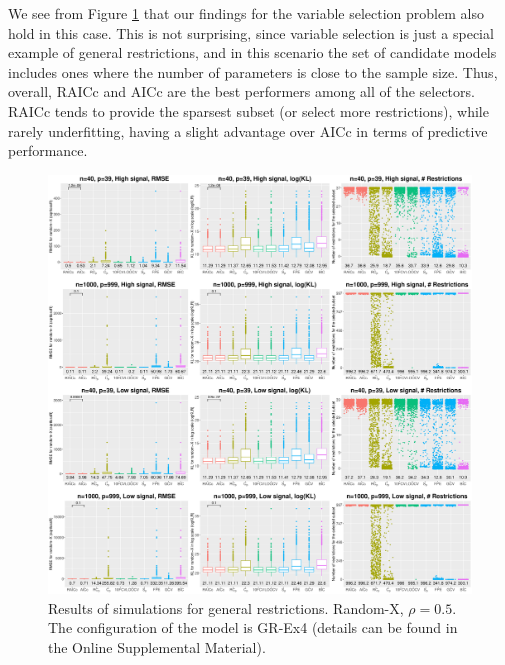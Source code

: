 We see from Figure \ref{fig:subsetgeneral_randomx} that our findings for the variable selection problem also hold in this case. This is not surprising, since variable selection is just a special example of general restrictions, and in this scenario the set of candidate models includes ones where the number of parameters is close to the sample size. Thus, overall, RAICc and AICc are the best performers among all of the selectors. RAICc tends to provide the sparsest subset (or select more restrictions), while rarely underfitting, having a slight advantage over AICc in terms of predictive performance. 

\begin{figure}[!ht]
  \centering
  \includegraphics[width=\textwidth]{figures/main/randomx_GR-Ex4.eps}
  \caption{Results of simulations for general restrictions. Random-X, $\rho=0.5$. The configuration of the model is GR-Ex4 (details can be found in the Online Supplemental Material).}
  \label{fig:subsetgeneral_randomx}
\end{figure}

\iffalse
